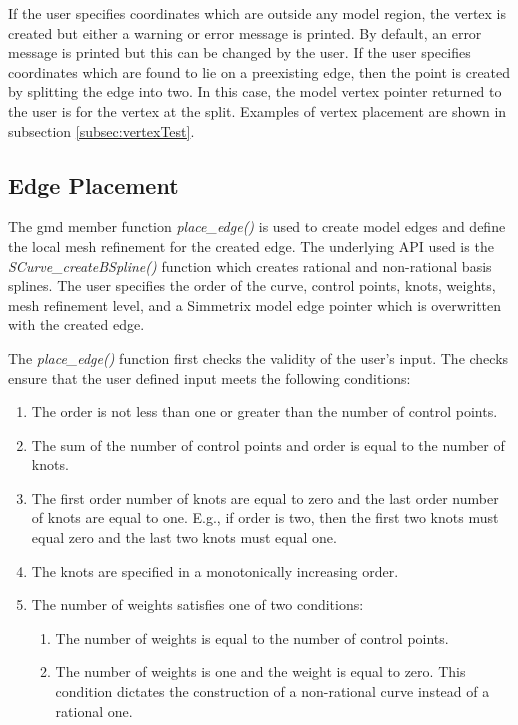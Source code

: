\documentclass[a4paper, 12pt]{article}
\begin{document}
If the user specifies coordinates
which are outside any model region, the vertex is created but either a 
warning or error message is printed. By default, an error message is printed
but this can be changed by the user. If the user specifies coordinates 
which are found to lie on a preexisting edge, then the point is created
by splitting the edge into two. In this case, the model vertex pointer
returned to the user is for the vertex at the split.
Examples of vertex placement are shown in 
subsection \ref{subsec:vertexTest}.

\subsection{Edge Placement} \label{subsec:edge}
The gmd member function \emph{place\_edge()} is used to create model edges and 
define the local mesh refinement for the created edge. The underlying API used
is the \emph{SCurve\_createBSpline()} function which creates rational and non-rational
basis splines. The user specifies the order of the curve, control points, knots,
weights, mesh refinement level, and a Simmetrix model edge pointer which is 
overwritten with the created edge. 

The \emph{place\_edge()} function first checks the validity of the user's input.
The checks ensure that the user defined input meets the following conditions:
\begin{enumerate}
  \item The order is not less than one or greater than the number of control points.
  \item The sum of the number of control points and order is equal to 
      the number of knots.
  \item The first order number of knots are equal to zero and the last order number 
      of knots are equal to one. E.g., if order is two, then the first two 
      knots must equal zero and the last two knots must equal one.
  \item The knots are specified in a monotonically increasing order. 
  \item The number of weights satisfies one of two conditions:
    \begin{enumerate}
      \item The number of weights is equal to the number of control points.
      \item The number of weights is one and the weight is equal to zero. 
          This condition dictates the construction of a non-rational curve
          instead of a rational one.
    \end{enumerate}
\end{enumerate}
\end{document}
